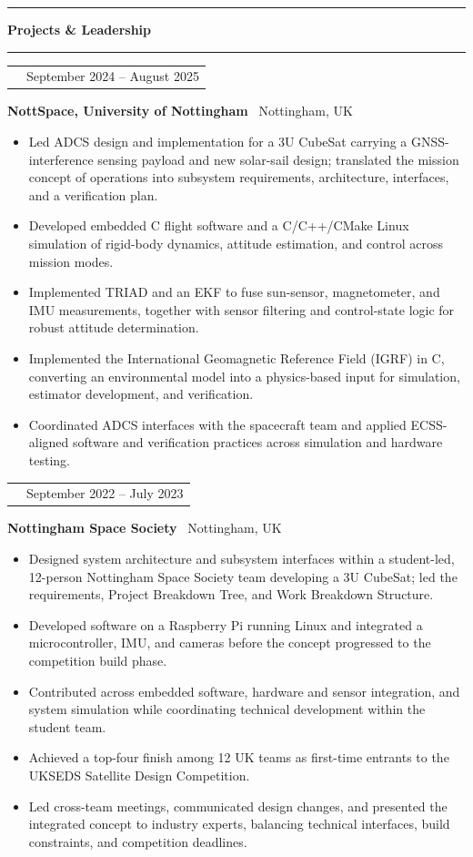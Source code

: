 \documentclass[10pt,a4paper]{article}
\makeatletter
\newcommand{\SectionSize}{11.5pt}
\newcommand{\RoleSize}{10.3pt}
\newcommand{\CompanySize}{9.6pt}
\newcommand{\DurationSize}{9pt}
\newcommand{\BodySize}{9.2pt}
\newcommand{\SectionLineSize}{12pt}
\newcommand{\RoleLineSize}{11.5pt}
\newcommand{\CompanyLineSize}{10.8pt}
\newcommand{\DurationLineSize}{9pt}
\newcommand{\BodyLineSize}{11pt}
\newcommand{\SectionBefore}{4pt}
\newcommand{\SectionLineToTitle}{0pt}
\newcommand{\SectionTitleToLine}{2pt}
\newcommand{\SectionLineToEntry}{0pt}
\newcommand{\EntryBefore}{0pt}
\newcommand{\RoleToCompany}{-5pt}
\newcommand{\CompanyToBullets}{3pt}
\newcommand{\EntryAfter}{6pt}
\newcommand{\BulletSpacing}{2pt}
\newcommand{\BulletBefore}{0pt}
\newcommand{\BulletIndent}{1.25em}
\newcommand{\SectionLineThickness}{1.5pt}
\newcommand{\SubsectionLineThickness}{0.4pt}
\newcommand{\DurationWidth}{4.5cm}
\newcommand{\CVSection}[1]{

    \vspace{\SectionBefore}


    \noindent
    \textcolor{CVBlack}{
        \rule{\textwidth}{\SectionLineThickness}
    }

    \vspace{\SectionLineToTitle}


    {\fontsize{\SectionSize}{\SectionLineSize}
    \selectfont
    \textbf{\textcolor{CVBlack}{#1}}}

    \vspace{\SectionTitleToLine}


    \noindent
    \textcolor{CVLightGray}{
        \rule{\textwidth}{\SubsectionLineThickness}
    }

    \vspace{\SectionLineToEntry}
}
\newcommand{\CVEntry}[5]{

    \vspace{\EntryBefore}


    \noindent
    \begin{tabularx}{\textwidth}{
        @{}
        >{\raggedright\arraybackslash}X
        >{\raggedleft\arraybackslash}p{\DurationWidth}
        @{}
    }

        {\fontsize{\RoleSize}{\RoleLineSize}
        \selectfont
        \textbf{\textcolor{CVBlack}{#1}}}
        &
        {\fontsize{\DurationSize}{\DurationLineSize}
        \selectfont
        \textcolor{CVGray}{#4}}

    \end{tabularx}

    \vspace{\RoleToCompany}


    \noindent
    {\fontsize{\CompanySize}{\CompanyLineSize}
    \selectfont
    \textbf{\textcolor{CVDarkGray}{#2}}
    \textcolor{CVGray}{\textbar\ #3}}

    \vspace{\CompanyToBullets}


    \begin{itemize}[
        leftmargin=\BulletIndent,
        itemsep=\BulletSpacing,
        topsep=\BulletBefore,
        parsep=0pt,
        partopsep=0pt
    ]
        #5
    \end{itemize}

    \vspace{\EntryAfter}
}
\newcommand{\CVBullet}[1]{
    \item
    {\fontsize{\BodySize}{\BodyLineSize}
    \selectfont
    \textcolor{CVDarkGray}{#1}}
}
\makeatother
\begin{document}

\CVSection{Projects \& Leadership}

\CVEntry
{JamSail 3U CubeSat -- AOCS/ADCS Lead}
{NottSpace, University of Nottingham}
{Nottingham, UK}
{September 2024 -- August 2025}
{
    \CVBullet{Led ADCS design and implementation for a 3U CubeSat carrying a GNSS-interference sensing payload and new solar-sail design; translated the mission concept of operations into subsystem requirements, architecture, interfaces, and a verification plan.}

    \CVBullet{Developed embedded C flight software and a C/C++/CMake Linux simulation of rigid-body dynamics, attitude estimation, and control across mission modes.}

    \CVBullet{Implemented TRIAD and an EKF to fuse sun-sensor, magnetometer, and IMU measurements, together with sensor filtering and control-state logic for robust attitude determination.}

    \CVBullet{Implemented the International Geomagnetic Reference Field (IGRF) in C, converting an environmental model into a physics-based input for simulation, estimator development, and verification.}

    \CVBullet{Coordinated ADCS interfaces with the spacecraft team and applied ECSS-aligned software and verification practices across simulation and hardware testing.}
}

\clearpage

\CVEntry
{IDET-Sat -- Systems Engineer}
{Nottingham Space Society}
{Nottingham, UK}
{September 2022 -- July 2023}
{
    \CVBullet{Designed system architecture and subsystem interfaces within a student-led, 12-person Nottingham Space Society team developing a 3U CubeSat; led the requirements, Project Breakdown Tree, and Work Breakdown Structure.}

    \CVBullet{Developed software on a Raspberry Pi running Linux and integrated a microcontroller, IMU, and cameras before the concept progressed to the competition build phase.}

    \CVBullet{Contributed across embedded software, hardware and sensor integration, and system simulation while coordinating technical development within the student team.}

    \CVBullet{Achieved a top-four finish among 12 UK teams as first-time entrants to the UKSEDS Satellite Design Competition.}

    \CVBullet{Led cross-team meetings, communicated design changes, and presented the integrated concept to industry experts, balancing technical interfaces, build constraints, and competition deadlines.}
}
\end{document}
